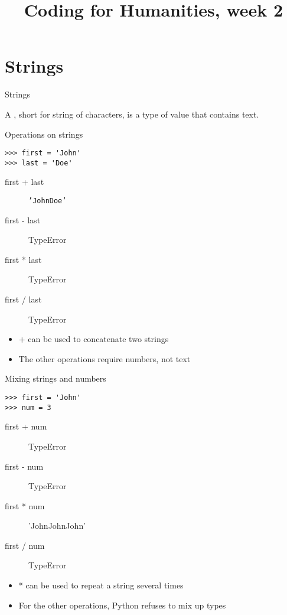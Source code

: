\documentclass[aspectratio=169,usenames,dvipsnames]{beamer}
\title{Coding for Humanities, week 2}
\begin{document}
\begin{frame}
 \titlepage
\end{frame}

\begin{frame}
 \tableofcontents
\end{frame}

\frame{\tableofcontents[currentsection]}
\section{Strings}
\begin{frame}{Strings}
    \begin{definition}
        A , short for string of characters,
        is a type of value that contains text.
    \end{definition}

\end{frame}

\begin{frame}[fragile]{Operations on strings}
\begin{lstlisting}
>>> first = 'John'
>>> last = 'Doe'
\end{lstlisting}
\begin{description}
    \item[first + last] \texttt{'JohnDoe'}
    \item[first - last] TypeError
    \item[first * last] TypeError
    \item[first / last] TypeError
\end{description}

\begin{itemize}
\item + can be used to concatenate two strings
\item The other operations require numbers, not text
\end{itemize}
\end{frame}

\begin{frame}[fragile]{Mixing strings and numbers}
\begin{lstlisting}
>>> first = 'John'
>>> num = 3
\end{lstlisting}
\begin{description}
    \item[first + num] TypeError
    \item[first - num] TypeError
    \item[first * num] 'JohnJohnJohn'
    \item[first / num] TypeError
\end{description}

\begin{itemize}
\item * can be used to repeat a string several times
\item For the other operations, Python refuses to mix up types
\end{itemize}
\end{frame}
\end{document}
